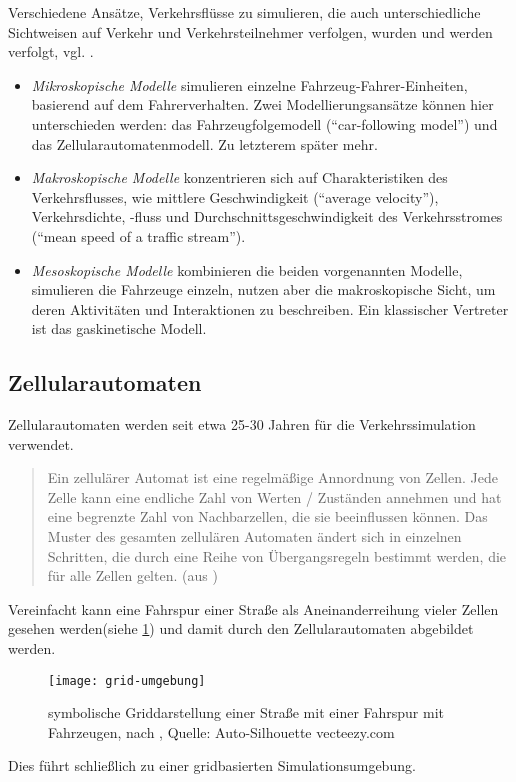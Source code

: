Verschiedene Ansätze, Verkehrsflüsse zu simulieren, die auch unterschiedliche Sichtweisen auf Verkehr und Verkehrsteilnehmer verfolgen, %
wurden und werden verfolgt, vgl. \cite{dingding}.
\begin{itemize}
	\item \textit{Mikroskopische Modelle} simulieren einzelne Fahrzeug-Fahrer-Einheiten, basierend auf dem Fahrerverhalten. Zwei Modellierungsansätze können hier unterschieden werden: das Fahrzeugfolgemodell (\enquote{car-following model}) und das Zellularautomatenmodell. Zu letzterem später mehr.
	\item \textit{Makroskopische Modelle}  konzentrieren sich auf Charakteristiken des Verkehrsflusses, wie mittlere Geschwindigkeit (\enquote{average velocity}), Verkehrsdichte, -fluss und Durchschnittsgeschwindigkeit des Verkehrsstromes (\enquote{mean speed of a traffic stream}).
	\item \textit{Mesoskopische Modelle} kombinieren die beiden vorgenannten Modelle, simulieren die Fahrzeuge einzeln, nutzen aber die makroskopische Sicht, um deren Aktivitäten und Interaktionen zu beschreiben. Ein klassischer Vertreter ist das gaskinetische Modell.
\end{itemize}



\subsection{Zellularautomaten}
\label{sec:ca}

Zellularautomaten werden seit etwa 25-30 Jahren für die Verkehrssimulation verwendet.

\begin{quote}
Ein zellulärer Automat ist eine regelmäßige Annordnung von Zellen. Jede Zelle kann eine endliche Zahl von Werten / Zuständen annehmen und hat eine  begrenzte Zahl von Nachbarzellen, die sie beeinflussen können. Das Muster des gesamten zellulären Automaten ändert sich in einzelnen Schritten, die durch eine Reihe von Übergangsregeln bestimmt werden, die für alle Zellen gelten. (aus \cite{cell-autom})
\end{quote} 

\noindent
Vereinfacht kann eine Fahrspur einer Straße als Aneinanderreihung vieler Zellen gesehen werden(siehe \cref{figure:grid-umgebung}) und damit durch den Zellularautomaten abgebildet werden. 
\begin{figure}[hptb]
 \centering
 \texttt{[image: grid-umgebung]}
 \caption[Beispiel für eine Griddarstellung einer Straße]
 		{symbolische Griddarstellung einer Straße mit einer Fahrspur mit Fahrzeugen, nach \cite{multi-lane}, Quelle: Auto-Silhouette vecteezy.com}
 \label{figure:grid-umgebung}
\end{figure} 
Dies führt schließlich zu einer gridbasierten Simulationsumgebung. 


